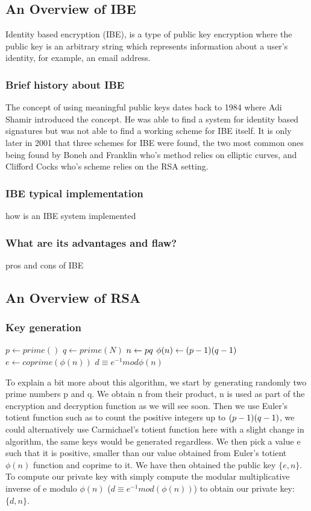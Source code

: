 \documentclass[conference]{IEEEtran}
\begin{document}
\subsection{An Overview of IBE}
Identity based encryption (IBE), is a type of public key encryption 
where the public key is an arbitrary string which represents information
about a user's identity, for example, an email address. 
\subsubsection{Brief history about IBE}
The concept of using meaningful public keys dates back to 1984 where Adi Shamir
introduced the concept. He was able to find a system for identity based signatures 
but was not able to find a working scheme for IBE itself. It is only later in 
2001 that three schemes for IBE were found, the two most common ones being 
found by Boneh and Franklin who's method relies on elliptic curves, and 
Clifford Cocks who's scheme relies on the RSA setting.

\subsubsection{IBE typical implementation}
how is an IBE system implemented

\subsubsection{What are its advantages and flaw?}
pros and cons of IBE

\subsection{An Overview of RSA}
\subsubsection{Key generation}

\begin{algorithmic}
\STATE $p \leftarrow prime()$
\STATE $q \leftarrow prime(N)$
\STATE $n \leftarrow p \* q$
\STATE $\phi (n) \leftarrow (p - 1) \* (q - 1)$
\STATE $e \leftarrow coprime(\phi (n))$
\STATE $d \equiv e^{-1} mod \phi(n)$
\end{algorithmic}
To explain a bit more about this algorithm, we start by generating randomly two prime numbers
p and q. We obtain n from their product, n is used as part of the encryption and decryption function
as we will see soon. Then we use Euler's totient function such as to count the positive integers
up to $(p - 1) \* (q - 1)$, we could alternatively use Carmichael's totient function here 
with a slight change in algorithm, the same keys would be generated regardless. We then pick a value e
such that it is positive, smaller than our value obtained from Euler's totient $\phi(n) $ function and coprime to it.
We have then obtained the public key $\{e,n\}$. To compute our private key with simply compute 
the modular multiplicative inverse of e modulo $\phi(n)$ ($d \equiv e^{-1} mod(\phi(n))$) to obtain
our private key: $\{d,n\}$.
\end{document}
